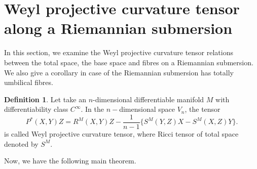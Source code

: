 \documentclass{birkjour}
\theoremstyle{definition}
\newtheorem{definition}[theorem]{Definition}
\theoremstyle{remark}
\numberwithin{equation}{section}
\begin{document}
\section{Weyl projective curvature tensor along a Riemannian submersion}
In this section, we examine the Weyl projective curvature tensor relations between the total space, the base space and fibres on  a Riemannian submersion. We also give a corollary in case of the Riemannian submersion has totally umbilical fibres.
\begin{definition}\cite{mishra}
	Let take an $n$-dimensional differentiable manifold $M$ with
	differentiability class $C^{\infty }$. In the $n-$dimensional space $V_n$, the tensor
	\begin{equation*}
	P^*(X,Y)Z=R^M(X,Y)Z-\frac{1}{n-1}\{S^M(Y,Z)X-S^M(X,Z)Y\}. \label{5.3}
	\end{equation*}
	is called Weyl projective curvature tensor, where Ricci tensor of total space denoted by $S^{M}.$
\end{definition}
Now, we have the following main theorem.
\end{document}
